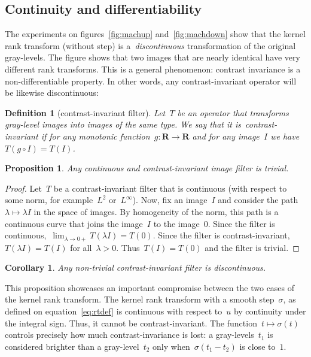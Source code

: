 \documentclass[12pt]{article}                  %
\newtheorem{definition}{Definition}
\newtheorem{proposition}{Proposition}
\newtheorem{corollary}{Corollary}
\begin{document}
\subsection{Continuity and differentiability}

The experiments on figures~\ref{fig:machup} and~\ref{fig:machdown} show that
the kernel rank transform (without step) is a~\emph{discontinuous}
transformation of the original gray-levels.  The figure shows that two
images that are nearly identical have very different rank transforms.  This
is a general phenomenon: contrast invariance is a non-differentiable
property.  In other words, any contrast-invariant operator will be likewise
discontinuous:

\begin{definition}[contrast-invariant filter]
	Let~$T$ be an operator that transforms gray-level images into images
	of the same type.  We say that it is~\emph{contrast-invariant} if
	for any
	monotonic function~$g:\mathbf{R}\to\mathbf{R}$ and for any image~$I$
	we have~$T(g\circ I)=T(I)$.
\end{definition}

\begin{proposition}
	Any continuous and contrast-invariant image filter is trivial.
\end{proposition}
\begin{proof}
	Let~$T$ be a contrast-invariant filter that is continuous (with
	respect to some norm, for example~$L^2$ or~$L^\infty$).
	Now, fix an image~$I$ and consider the
	path~$\lambda\mapsto \lambda I$ in the space of images.  By
	homogeneity of the norm, this path
	is a continuous curve that joins the image~$I$ to the image~$0$.
	Since the filter is continuous,~$\displaystyle\lim_{\lambda\to
	0+}T(\lambda I)=T(0)$.
	Since the filter is contrast-invariant,~$T(\lambda I)=T(I)$
	for all~$\lambda>0$.
	Thus~$T(I)=T(0)$ and the filter is trivial.
\end{proof}

\begin{corollary}
	Any non-trivial contrast-invariant filter is discontinuous.
\end{corollary}

This proposition showcases an important compromise between the two cases of
the kernel rank transform.
The kernel rank transform with a smooth step~$\sigma$, as defined on
equation~\ref{eq:rtdef} is continuous with respect to~$u$ by continuity
under the integral sign.  Thus, it cannot be contrast-invariant.  The
function~$t\mapsto\sigma(t)$ controls precisely how much contrast-invariance
is lost: a gray-levels~$t_1$ is considered brighter than a gray-level~$t_2$
only when~$\sigma(t_1-t_2)$ is close to~$1$.
\end{document}
